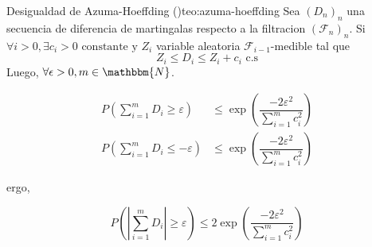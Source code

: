 \begin{theorem}{Desigualdad de Azuma-Hoeffding (\cite{azuma1967weighted})}{teo:azuma-hoeffding}
    Sea \((D_n)_n\) una secuencia de diferencia de martingalas respecto a la filtracion \((\mathcal{F}_n)_n\). Si \(\forall i>0, \exists c_i >0 \text{ constante y } Z_i\) variable aleatoria \(\mathcal{F}_{i-1}\)-medible tal que
    \[
        Z_i \leq D_i \leq Z_i + c_i \text{ c.s}
    \]
    Luego, \(\forall \epsilon>0, m \in \mathbbm{N}\).

    \begin{align}
        P\left(\sum^m_{i=1} D_i \geq \varepsilon\right) &\leq \operatorname{exp}\left(\dfrac{-2\varepsilon^2}{\sum^m_{i=1}c_i^2}\right) \label{eq:azuma1} \\
        P\left(\sum^m_{i=1} D_i \leq -\varepsilon\right) &\leq \operatorname{exp}\left(\dfrac{-2\varepsilon^2}{\sum^m_{i=1}c_i^2}\right) \label{eq:azuma2}
    \end{align}

    ergo,

    \begin{equation}
        P\left(\left|\sum^m_{i=1} D_i\right| \geq \varepsilon\right) \leq 2\operatorname{exp}\left(\dfrac{-2\varepsilon^2}{\sum^m_{i=1}c_i^2}\right)
    \end{equation}
\end{theorem}

